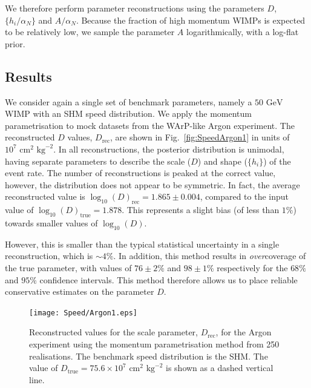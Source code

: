 We therefore perform parameter reconstructions using the parameters \(D\), \(\{h_i/\alpha_N\}\) and \(A/\alpha_N\). Because the fraction of high momentum WIMPs is expected to be relatively low, we sample the parameter \(A\) logarithmically, with a log-flat prior.

\subsection{Results}

We consider again a single set of benchmark parameters, namely a \(50 \textrm{ GeV}\) WIMP with an SHM speed distribution. We apply the momentum parametrisation to mock datasets from the WArP-like Argon experiment. The reconstructed \(D\) values, \(D_\textrm{rec}\),  are shown in Fig.\ \ref{fig:SpeedArgon1} in units of \(10^7 \textrm{ cm}^2 \textrm{ kg}^{-2}\). In all reconstructions, the posterior distribution is unimodal, having separate parameters to describe the scale (\(D\)) and shape (\(\{h_i\}\)) of the event rate. The number of reconstructions is peaked at the correct value, however, the distribution does not appear to be symmetric. In fact, the average reconstructed value is \(\log_{10}(D)_\textrm{rec} = 1.865 \pm 0.004\), compared to the input value of \(\log_{10}(D)_\textrm{true} = 1.878\). This represents a slight bias (of less than \(1\%\)) towards smaller values of \(\log_{10}(D)\).

However, this is smaller than the typical statistical uncertainty in a single reconstruction, which is \(\sim 4\%\). In addition, this method results in \textit{over}coverage of the true parameter, with values of \(76 \pm 2 \%\) and \(98 \pm 1\%\) respectively for the \(68\%\) and \(95\%\) confidence intervals. This method therefore allows us to place reliable conservative estimates on the parameter \(D\).

\begin{figure}[t]
\centering
  \texttt{[image: Speed/Argon1.eps]}
  \caption[Distribution of the reconstructed scale parameter, $D_\textrm{rec}$, for the Argon experiment using the momentum parametrisation]{Reconstructed values for the scale parameter, \(D_\textrm{rec}\), for the Argon experiment using the momentum parametrisation method from 250 realisations. The benchmark speed distribution is the SHM. The value of \(D_\textrm{true} = 75.6 \times 10^7 \textrm{ cm}^2 \textrm{ kg}^{-2}\) is shown as a dashed vertical line.}
   \label{fig:SpeedSpeed:Argon1}
\end{figure}

